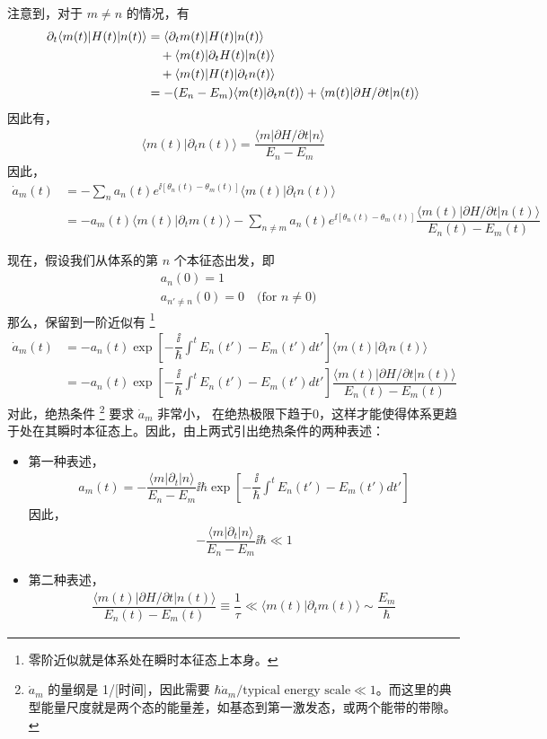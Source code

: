 注意到，对于 $m\neq n$ 的情况，有
\begin{align}
\partial_t\langle m(t)|H(t)|n(t)\rangle
    &= \langle\partial_tm(t)|H(t)|n(t)\rangle \notag \\
    & \quad +\langle m(t)|\partial_tH(t)|n(t)\rangle \notag \\
    & \quad +\langle m(t)|H(t)|\partial_tn(t)\rangle\\
    &= -(E_n-E_m)\langle m(t)|\partial_tn(t)\rangle+\langle m(t)|\partial H/\partial t|n(t)\rangle
\end{align}
因此有，
\begin{align}
\langle m(t)|\partial_tn(t)\rangle=\dfrac{\langle m|\partial H/\partial t|n\rangle}{E_n-E_m}
\end{align}
因此，
\begin{align}
\dot{a}_m(t) &=-\sum_na_{n}(t)e^{\ii[\theta_n(t)-\theta_m(t)]}\langle m(t)|\partial_tn(t)\rangle\\
    &= -a_m(t)\langle m(t)|\partial_tm(t)\rangle-\sum_{n\neq m}a_{n}(t)e^{\ii[\theta_n(t)-\theta_m(t)]}\dfrac{\langle m(t)|\partial H/\partial t|n(t)\rangle}{E_n(t)-E_m(t)}
\end{align}

现在，假设我们从体系的第 $n$ 个本征态出发，即
\begin{align}
& a_n(0)=1\\
& a_{n'\neq n}(0)=0 \quad\text{(for $n\neq0$)}
\end{align}
那么，保留到一阶近似有
\footnote{零阶近似就是体系处在瞬时本征态上本身。}
\begin{align}\label{eq:amdot}
\dot{a}_m(t) 
    &= -a_{n}(t)\exp\left[-\dfrac{\ii}{\hbar}\int^tE_n(t')-E_m(t')dt'\right]\langle m(t)|\partial_tn(t)\rangle\\
    &= -a_{n}(t)\exp\left[-\dfrac{\ii}{\hbar}\int^tE_n(t')-E_m(t')dt'\right]\dfrac{\langle m(t)|\partial H/\partial t|n(t)\rangle}{E_n(t)-E_m(t)}
\end{align}
对此，绝热条件
\footnote{$\dot{a}_m$ 的量纲是 1/[时间]，因此需要 $\hbar\dot{a}_m/\text{typical energy scale}\ll1$。而这里的典型能量尺度就是两个态的能量差，如基态到第一激发态，或两个能带的带隙。}
要求 $\dot{a}_m$ 非常小，
在绝热极限下趋于0，这样才能使得体系更趋于处在其瞬时本征态上。因此，由上两式引出绝热条件的两种表述：
\begin{itemize}
\item 第一种表述，\cite{niu2010}
\begin{align}\label{eq:am}
a_m(t)=-\dfrac{\langle m|\partial_t|n\rangle}{E_n-E_m}\ii\hbar\exp\left[-\dfrac{\ii}{\hbar}\int^tE_n(t')-E_m(t')dt'\right]
\end{align}
因此，
\begin{align}
-\dfrac{\langle m|\partial_t|n\rangle}{E_n-E_m}\ii\hbar\ll1
\end{align}
\item 第二种表述，\cite{sakurai}
\begin{align}
\dfrac{\langle m(t)|\partial H/\partial t|n(t)\rangle}{E_n(t)-E_m(t)}\equiv\dfrac{1}{\tau}\ll\langle m(t)|\partial_tm(t)\rangle\sim\dfrac{E_m}{\hbar}
\end{align}
\end{itemize}


